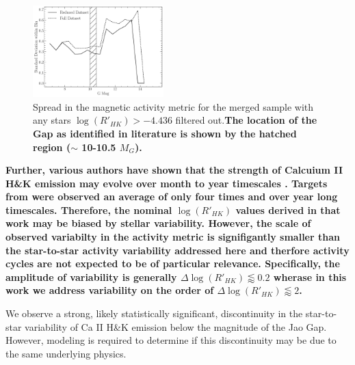 \begin{figure}
  \centering
  \includegraphics[width=0.45\textwidth]{figures/ReducedDeviation.pdf}
  \caption{Spread in the magnetic activity metric for the merged sample with
  any stars $\log(R'_{HK}) > -4.436$ filtered out.\textbf{The location of the Gap
  as identified in literature is shown by the hatched region ($\sim$ 10-10.5 $M_{G}$).}}
  \label{fig:reduced}
\end{figure}

\textbf{Further, various authors have shown that the strength of Calcuium II
H\&K emission may evolve over month to year timescales
\citep[e.g.][]{Rauscher2006, Perdelwitz2021, Cretignier2024}. Targets from
\citet{Boudreaux2022} were observed an average of only four times and over year
long timescales. Therefore, the nominal $\log(R'_{HK})$ values derived in that
work may be biased by stellar variability. However, the scale of observed
variabilty in the activity metric is signifigantly smaller than the
star-to-star activity variability addressed here and therfore activity cycles
are not expected to be of particular relevance. Specifically, the amplitude of
variability is generally $\Delta \log(R'_{HK}) \lessapprox 0.2$ wherase in this
work we address variability on the order of $\Delta \log(R'_{HK}) \lessapprox 2$.}

We observe a strong, likely statistically significant, discontinuity in the
star-to-star variability of Ca II H\&K emission below the magnitude
of the Jao Gap. However, modeling is required to determine if this discontinuity
may be due to the same underlying physics.

